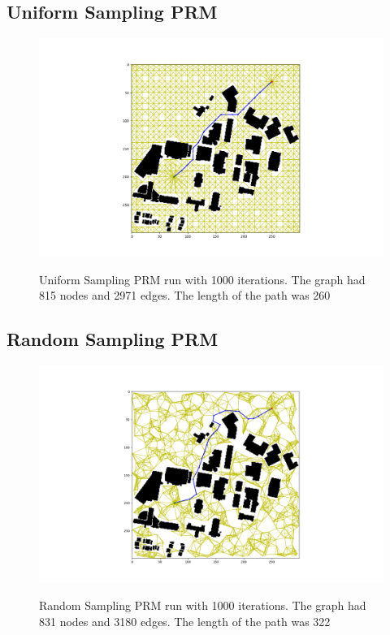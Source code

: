 \documentclass[journal]{IEEEtran}
\begin{document}
    \subsection{Uniform Sampling PRM}
    \begin{figure}[H]
        \includegraphics[width=\linewidth]{figures/UniformPRM.png}
        \label{fig:UniformPRM}
        \caption{Uniform Sampling PRM run with 1000 iterations. The graph had 815 nodes and 2971 edges. The length of the path was 260}
    \end{figure} 

    

    \subsection{Random Sampling PRM}
    \begin{figure}[H]
        \includegraphics[width=\linewidth]{figures/RandomPRM.png}
        \label{fig:RandomPRM}
        \caption{Random Sampling PRM run with 1000 iterations. The graph had 831 nodes and 3180 edges. The length of the path was 322}
    \end{figure} 
\end{document}
